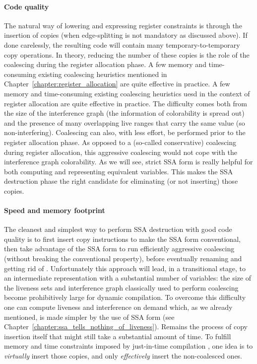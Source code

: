 \paragraph{Code quality}
The natural way of lowering \phifuns{} and expressing register constraints is through the insertion of copies (when edge-splitting is not mandatory as discussed above). 
If done carelessly, the resulting code will contain many temporary-to-temporary copy operations. 
In theory, reducing the number of these copies is the role of the coalescing during the register allocation phase. 
\ifregin
A few memory and time-consuming existing coalescing heuristics mentioned in Chapter~\ref{chapter:register_allocation} are quite effective in practice.
\else
A few memory and time-consuming existing coalescing heuristics uesd in the context of register allocation are quite effective in practice.
\fi
The difficulty comes both from the size of the interference graph (the information of colorability is spread out) and the presence of many overlapping live ranges that carry the same value (so non-interfering). 
Coalescing can also, with less effort, be performed prior to the register allocation phase. 
As opposed to a (so-called conservative) coalescing during register allocation, this aggressive coalescing would not cope with the interference graph colorability. 
As we will see, strict SSA form is really helpful for both computing and representing equivalent variables. 
This makes the SSA destruction phase the right candidate for eliminating (or not inserting) those copies.

\paragraph{Speed and memory footprint}
The cleanest and simplest way to perform SSA destruction with good code quality is to first insert copy instructions to make the SSA form conventional, then take advantage of the SSA form to run efficiently aggressive coalescing (without breaking the conventional property), before eventually renaming \phiwebs\index{\phiweb} and getting rid of \phifuns. 
Unfortunately this approach will lead, in a transitional stage, to an intermediate representation with a substantial number of variables: 
the size of the liveness sets and interference graph classically used to perform coalescing become prohibitively large for dynamic compilation. 
To overcome this difficulty one can compute liveness and interference on demand which, as we already mentioned, is made simpler by the use of SSA form (see Chapter~\ref{chapter:ssa_tells_nothing_of_liveness}). 
Remains the process of copy insertion itself that might still take a substantial amount of time. 
To fulfill memory and time constraints imposed by just-in-time compilation , one idea is to \emph{virtually} insert those copies, and only \emph{effectively} insert the non-coalesced ones.

